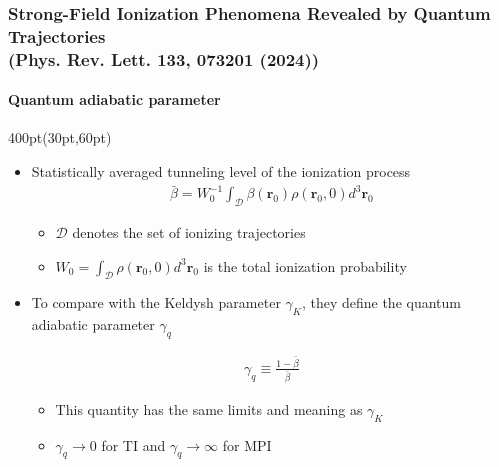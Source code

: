 \begin{frame}
\frametitle{Strong-Field Ionization Phenomena Revealed by Quantum Trajectories \\
\small (Phys. Rev. Lett. \textbf{133}, 073201 (2024))}
\framesubtitle{Quantum adiabatic parameter}

\small
\begin{textblock*}{400pt}(30pt,60pt)
\begin{itemize}
\footnotesize
\item Statistically averaged tunneling level of the ionization process
\begin{align}
\bar{\beta} = W_0^{-1} \int_{\mathcal D} \beta\left( \boldsymbol{r}_0\right)
\rho\left( \boldsymbol{r}_0,0\right)
d^3 \boldsymbol{r}_0 \nonumber
\end{align}
\begin{itemize}
\footnotesize
\item[$\bullet$] $\mathcal{D}$ denotes the set of ionizing trajectories
\item[$\bullet$] $W_0 = \int_{\mathcal D} \rho\left(\boldsymbol{r}_0,0\right)d^3\boldsymbol{r}_0$ is the total ionization probability
\end{itemize}

\vspace{10pt}

\item To compare with the Keldysh parameter $\gamma_K$, they define 
the quantum adiabatic parameter $\gamma_q$

\begin{align}
\gamma_q \equiv \frac{1-\bar{\beta}}{\bar{\beta}}  \nonumber
\end{align}
\begin{itemize}
\footnotesize
\item[$\bullet$] This quantity has the same limits and meaning as $\gamma_K$
\item[$\bullet$] $\gamma_q \longrightarrow 0$ for TI and
$\gamma_q \longrightarrow \infty$ for MPI
\end{itemize}
\end{itemize}

\end{textblock*}

\end{frame}


